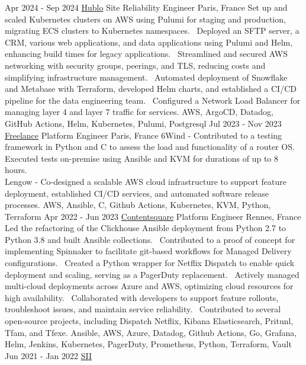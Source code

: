 \documentclass[10pt]{developercv}
\begin{document}
\begin{entrylist}
	\entry
		{Apr 2024 - Sep 2024}
		{\href{https://www.hublo.com/}{Hublo}}
		{Site Reliability Engineer}
		{Paris, France}
		{Set up and scaled Kubernetes clusters on AWS using Pulumi for staging and production, migrating ECS clusters to Kubernetes namespaces. \ 
		Deployed an SFTP server, a CRM, various web applications, and data applications using Pulumi and Helm, enhancing build times for legacy applications. \ 
		Streamlined and secured AWS networking with security groups, peerings, and TLS, reducing costs and simplifying infrastructure management. \ 
		Automated deployment of Snowflake and Metabase with Terraform, developed Helm charts, and established a CI/CD pipeline for the data engineering team. \ 
		Configured a Network Load Balancer for managing layer 4 and layer 7 traffic for services.
		}
		{AWS, ArgoCD, Datadog, GitHub Actions, Helm, Kubernetes, Pulumi, Postgresql}
	\entry
		{Jul 2023 - Nov 2023}
		{\href{https://craftedengineers.cloud/}{Freelance}}
		{Platform Engineer}
		{Paris, France}
		{6Wind - Contributed to a testing framework in Python and C to assess the load and functionality of a router OS. Executed tests on-premise using Ansible and KVM for durations of up to 8 hours.\\
		Lengow - Co-designed a scalable AWS cloud infrastructure to support feature deployment, established CI/CD services, and automated software release processes.
		}
		{AWS, Ansible, C, Github Actions, Kubernetes, KVM, Python, Terraform}
	\entry
		{Apr 2022 - Jun 2023}
		{\href{https://contentsquare.com/}{Contentsquare}}
		{Platform Engineer}
		{Rennes, France}
		{Led the refactoring of the Clickhouse Ansible deployment from Python 2.7 to Python 3.8 and built Ansible collections. \ 
		Contributed to a proof of concept for implementing Spinnaker to facilitate git-based workflows for Managed Delivery configurations. \ 
		Created a Python wrapper for Netflix Dispatch to enable quick deployment and scaling, serving as a PagerDuty replacement. \ 
		Actively managed multi-cloud deployments across Azure and AWS, optimizing cloud resources for high availability. \ 
		Collaborated with developers to support feature rollouts, troubleshoot issues, and maintain service reliability. \ 
		Contributed to several open-source projects, including Dispatch Netflix, Kibana Elasticsearch, Pritunl, Tfam, and Tfexe.
		}
		{Ansible, AWS, Azure, Datadog, Github Actions, Go, Grafana, Helm, Jenkins, Kubernetes, PagerDuty, Prometheus, Python, Terraform, Vault}
	\entry
		{Jun 2021 - Jan 2022}
		{\href{https://sii-group.com/}{SII}}

\end{entrylist}
\end{document}
